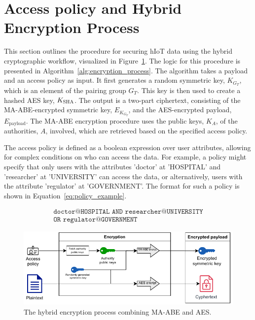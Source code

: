 \documentclass[cic,tc,english]{iiufrgs}
\numberwithin{algorithm}{chapter}
\begin{document}
    \section{Access policy and Hybrid Encryption Process}
        \label{sec:hybrid_encryption}

        This section outlines the procedure for securing hIoT data using the hybrid cryptographic workflow, visualized in Figure~\ref{fig:encryption_diagram}. The logic for this procedure is presented in Algorithm~\ref{alg:encryption_process}. The algorithm takes a payload and an access policy as input. It first generates a random symmetric key, $K_{G_T}$, which is an element of the pairing group $G_T$. This key is then used to create a hashed AES key, $K_{\textsc{SHA}}$. The output is a two-part ciphertext, consisting of the MA-ABE-encrypted symmetric key, $E_{K_{G_T}}$, and the AES-encrypted payload, $E_{\text{payload}}$. The MA-ABE encryption procedure uses the public keys, $K_A$, of the authorities, $A$, involved, which are retrieved based on the specified access policy. 

        The access policy is defined as a boolean expression over user attributes, allowing for complex conditions on who can access the data. For example, a policy might specify that only users with the attributes 'doctor' at 'HOSPITAL' and 'researcher' at 'UNIVERSITY' can access the data, or alternatively, users with the attribute 'regulator' at 'GOVERNMENT'. The format for such a policy is shown in Equation~\ref{eq:policy_example}.

        \begin{multline}
            \label{eq:policy_example}
            \texttt{doctor@HOSPITAL AND researcher@UNIVERSITY}\\
            \texttt{OR regulator@GOVERNMENT}
        \end{multline}

        \begin{figure}[h]
            \centering
            \includegraphics[width=\textwidth]{images/diagrams/encryption_diagram.pdf}
            \caption{The hybrid encryption process combining MA-ABE and AES.}
            \label{fig:encryption_diagram}
        \end{figure}
\end{document}
